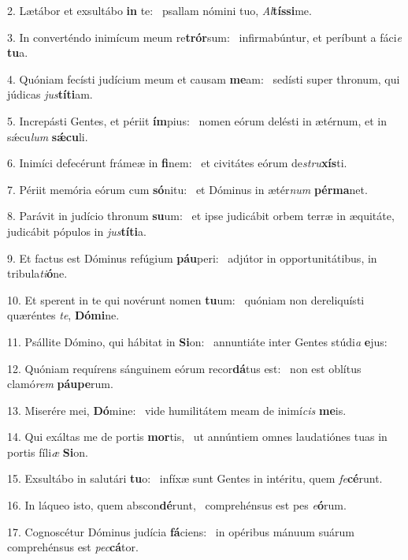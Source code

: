 2. Lætábor et exsultábo \textbf{in} te: \ast\  psallam nómini tuo, \textit{Al}\textbf{tís}\textbf{si}me.\

3. In converténdo inimícum meum re\textbf{trór}sum: \ast\  infirmabúntur, et períbunt a fáci\textit{e} \textbf{tu}a.\

4. Quóniam fecísti judícium meum et causam \textbf{me}am: \ast\  sedísti super thronum, qui júdicas \textit{jus}\textbf{tí}\textbf{ti}am.\

5. Increpásti Gentes, et périit \textbf{ím}pius: \ast\  nomen eórum delésti in ætérnum, et in sǽcu\textit{lum} \textbf{sǽ}\textbf{cu}li.\

6. Inimíci defecérunt frámeæ in \textbf{fi}nem: \ast\  et civitátes eórum de\textit{stru}\textbf{xís}ti.\

7. Périit memória eórum cum \textbf{só}nitu: \ast\  et Dóminus in ætér\textit{num} \textbf{pér}\textbf{ma}net.\

8. Parávit in judício thronum \textbf{su}um: \ast\  et ipse judicábit orbem terræ in æquitáte, judicábit pópulos in \textit{jus}\textbf{tí}\textbf{ti}a.\

9. Et factus est Dóminus refúgium \textbf{páu}peri: \ast\  adjútor in opportunitátibus, in tribula\textit{ti}\textbf{ó}ne.\

10. Et sperent in te qui novérunt nomen \textbf{tu}um: \ast\  quóniam non dereliquísti quæréntes \textit{te}, \textbf{Dó}\textbf{mi}ne.\

11. Psállite Dómino, qui hábitat in \textbf{Si}on: \ast\  annuntiáte inter Gentes stúdi\textit{a} \textbf{e}jus:\

12. Quóniam requírens sánguinem eórum recor\textbf{dá}tus est: \ast\  non est oblítus clamó\textit{rem} \textbf{páu}\textbf{pe}rum.\

13. Miserére mei, \textbf{Dó}mine: \ast\  vide humilitátem meam de inimí\textit{cis} \textbf{me}is.\

14. Qui exáltas me de portis \textbf{mor}tis, \ast\  ut annúntiem omnes laudatiónes tuas in portis fíli\textit{æ} \textbf{Si}on.\

15. Exsultábo in salutári \textbf{tu}o: \ast\  infíxæ sunt Gentes in intéritu, quem \textit{fe}\textbf{cé}runt.\

16. In láqueo isto, quem abscon\textbf{dé}runt, \ast\  comprehénsus est pes \textit{e}\textbf{ó}rum.\

17. Cognoscétur Dóminus judícia \textbf{fá}ciens: \ast\  in opéribus mánuum suárum comprehénsus est \textit{pec}\textbf{cá}tor.\


